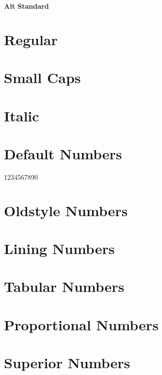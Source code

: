 \documentclass{article}
\begin{document}
\thispagestyle{empty}

\begin{center}\huge\bf Alt Standard
\end{center}


\section*{Regular}
\lipsum[1]

\section*{Small Caps}
\textsc{\lipsum[1]}

\section*{Italic}
\textit{\lipsum[2]}

\section*{Default Numbers}

1234567890

\section*{Oldstyle Numbers}


\section*{Lining Numbers}


\section*{Tabular Numbers}


\section*{Proportional Numbers}


\section*{Superior Numbers}
\end{document}
